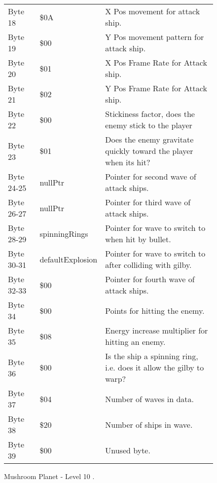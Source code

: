 \begin{figure}[H]
{\begin{adjustbox}{width=12cm}
\begin{tabular}{lll}
 Byte 18    & \$0A                        & X Pos movement for attack ship.                                     \\
 Byte 19    & \$00                        & Y Pos movement pattern for attack ship.                             \\
 Byte 20    & \$01                        & X Pos Frame Rate for Attack ship.                                   \\
 Byte 21    & \$02                        & Y Pos Frame Rate for Attack ship.                                   \\
 Byte 22    & \$00                        & Stickiness factor, does the enemy stick to the player               \\
 Byte 23    & \$01                        & Does the enemy gravitate quickly toward the player when its hit?    \\
 Byte 24-25 & nullPtr                    & Pointer for second wave of attack ships.                            \\
 Byte 26-27 & nullPtr                    & Pointer for third wave of attack ships.                             \\
 Byte 28-29 & spinningRings              & Pointer for wave to switch to when hit by bullet.                   \\
 Byte 30-31 & defaultExplosion           & Pointer for  wave to switch to after colliding with gilby.          \\
 Byte 32-33 & \$00                        & Pointer for fourth wave of attack ships.                            \\
 Byte 34    & \$00                        & Points for hitting the enemy.                                       \\
 Byte 35    & \$08                        & Energy increase multiplier for hitting an enemy.                    \\
 Byte 36    & \$00                        & Is the ship a spinning ring, i.e. does it allow the gilby to warp?  \\
 Byte 37    & \$04                        & Number of waves in data.                                            \\
 Byte 38    & \$20                        & Number of ships in wave.                                            \\
 Byte 39    & \$00                        & Unused byte.                                                        \\
\bottomrule
\end{tabular}

  \end{adjustbox}

  }\caption*{Mushroom Planet - Level 10
.}
\end{figure}

